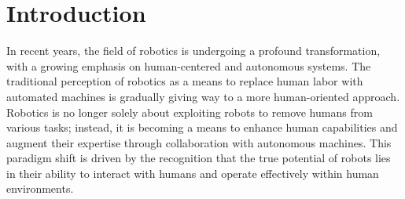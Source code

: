 
\chapter{Introduction} %
\label{ch:intro} %




In recent years, the field of robotics is undergoing a profound transformation, with a growing emphasis on human-centered and autonomous systems. The traditional perception of robotics as a means to replace human labor with automated machines is gradually giving way to a more human-oriented approach. Robotics is no longer solely about exploiting robots to remove humans from various tasks; instead, it is becoming a means to enhance human capabilities and augment their expertise through collaboration with autonomous machines. This paradigm shift is driven by the recognition that the true potential of robots lies in their ability to interact with humans and operate effectively within human environments.

